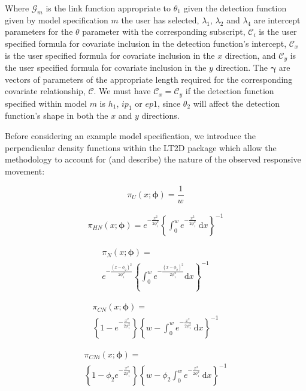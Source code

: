 \documentclass[11pt]{article}
\begin{document}
\begin{multicols}{2}
Where $\mathcal{G}_m$ is the link function appropriate to $\theta_1$ given the detection function given by model specification $m$ the user has selected, $\lambda_1$, $\lambda_2$ and $\lambda_4$ are intercept parameters for the $\theta$ parameter with the corresponding subscript, $\mathcal{C}_i$ is the user specified formula for covariate inclusion in the detection function's intercept, $\mathcal{C}_x$ is the user specified formula for covariate inclusion in the $x$ direction, and $\mathcal{C}_y$ is the user specified formula for covariate inclusion in the $y$ direction. The $\boldsymbol{\gamma}$ are vectors of parameters of the appropriate length required for the corresponding covariate relationship, $\mathcal{C}$. We must have $\mathcal{C}_x=\mathcal{C}_y$ if the detection function specified within model $m$ is $h_1$, $ip_1$ or $ep1$, since $\theta_2$ will affect the detection function's shape in both the $x$ and $y$ directions.

Before considering an example model specification, we introduce the perpendicular density functions within the LT2D package which allow the methodology to account for (and describe) the nature of the observed responsive movement:

\begingroup
\large

\begin{equation}
\pi_U\left(x;\boldsymbol{\phi}\right)=\frac{1}{w}
\end{equation}

\begin{multline}
\pi_{HN}{\left(x;\boldsymbol{\phi}\right)}= e^{-\frac{x^2}{2\phi_1^2}}\left\{\int_0^w{e^{-{\frac{x^2}{2\phi_1^2}}}\ \mathrm{d}x}\right\}^{-1}
\end{multline}

\begin{multline}
\pi_N\left(x;\boldsymbol{\phi}\right)=\\e^{-\frac{\left(x-\phi_2\right)^2}{2\phi_1^2}}\left\{\int_0^w{e^{-\frac{\left(x-\phi_2\right)^2}{2\phi_1^2}}\mathrm{d}x}\right\}^{-1}
\end{multline}

\begin{multline}
\pi_{CN}\left(x;\boldsymbol{\phi}\right) =\\ \left\{1-e^{-\frac{x^2}{2\phi_1^2}}\right\}\left\{w - \int_0^w{e^{-{\frac{x^2}{2\phi_1^2}}}\ \mathrm{d}x}\right\}^{-1}
\end{multline}

\begin{multline}
\pi_{CNi}\left(x;\boldsymbol{\phi}\right) = \\ \left\{1-\phi_2e^{-\frac{x^2}{2\phi_1^2}}\right\}\left\{w - \phi_2\int_0^w{e^{-{\frac{x^2}{2\phi_1^2}}}\ \mathrm{d}x}\right\}^{-1}
\end{multline}
\endgroup


\end{multicols}
\end{document}
